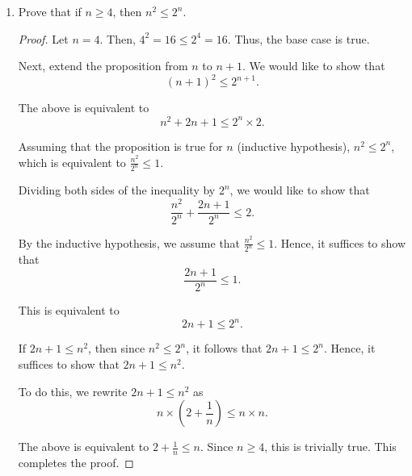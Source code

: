 \documentclass[11pt]{article}
\newcommand{\bbN}{\mathbb{N}}
\begin{document}
\begin{enumerate}
\begin{proof}
Let $P(m)$ be the proposition that the subset with cardinality $m$ has a least element. The base case is true for $m=1$, since if a set has only one element, that is the least element.

We now proceed with induction on $m$. The inductive hypothesis is that the subset $A \subset \bbN$ with cardinality $m$ has a least element, $n_0\in A$. Next, consider a subset $B \subset \bbN$ with cardinality $m+1$. There must exist some element $i \in B, i \notin A$.

We now compare this element $i$ with the least element of $A$, as per the following algorithm. If $i > n_0$, the least element remains unchanged. If $i < n_0$, i is the new least element. (Note that $i \neq n_0$ since $i \notin A$.)

Thus, if a subset of $\bbN$ with cardinality $m$ has a least element, then so does a subset of $\bbN$ with cardinality $m+1$. We have also shown that the base case holds for $m=1$. This completes the proof.

\renewcommand\qedsymbol{QED}

\end{proof}


\item  Prove that if $n\geq 4$, then $n^2\leq 2^n$.

\begin{proof}

Let $n = 4$. Then, $4^2 = 16 \leq 2^4 = 16$. Thus, the base case is true.

Next, extend the proposition from $n$ to $n+1$. We would like to show that
\[
    (n+1)^2 \leq 2^{n+1}.
\]

The above is equivalent to 
\[
    n^2 + 2n + 1 \leq 2^n \times 2.
\]

Assuming that the proposition is true for $n$ (inductive hypothesis), $n^2 \leq 2^n$, which is equivalent to $\frac{n^2}{2^n} \leq 1$.

Dividing both sides of the inequality by $2^n$, we would like to show that
\[
    \frac{n^2}{2^n} + \frac{2n+1}{2^n} \leq 2.
\]

By the inductive hypothesis, we assume that $\frac{n^2}{2^n} \leq 1$. Hence, it suffices to show that
\[
    \frac{2n+1}{2^n} \leq 1.
\]

This is equivalent to 
\[
    2n + 1 \leq 2^n.
\]

If $2n+1 \leq n^2$, then since $n^2 \leq 2^n$, it follows that $2n+1 \leq 2^n$. Hence, it suffices to show that $2n+1 \leq n^2$.

To do this, we rewrite $2n+1 \leq n^2$ as
\[
    n \times (2 + \frac{1}{n}) \leq n \times n.
\]

The above is equivalent to $2 + \frac{1}{n} \leq n$. Since $n \geq 4$, this is trivially true. This completes the proof.

\renewcommand\qedsymbol{QED}
\end{proof}

\end{enumerate}
\end{document}
